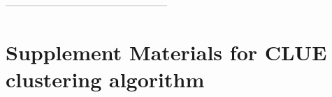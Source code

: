 \documentclass[12pt,reqno]{nuthesis}
\begin{document}
    \clearpage{} 
    \listoftables

    \clearpage{} 
    \listoffigures



    \mainmatter
    
    
    
    
    
    
    
    
    \begin{appendix}
        
        
        --------------------------------------------------
        \chapter{Supplement Materials for CLUE clustering algorithm}
        
        
    \end{appendix}
    
    
    
    
     

    \begin{singlespace}
    
    
    \end{singlespace}
    

    
\end{document}
